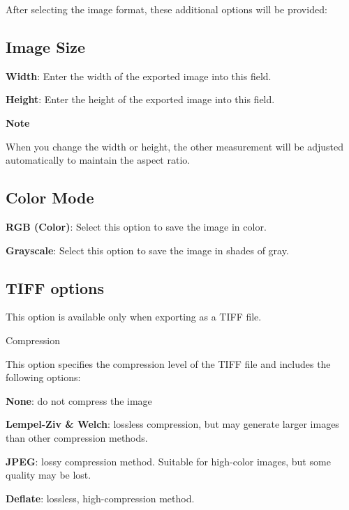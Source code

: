 \documentclass[
]{book}
\newenvironment{notesection}
    {
    \begin{tcolorbox}[colframe=mediumblue,colback=lightblue,coltext=mediumblue,arc=3mm]
    \faLightbulb[regular] \textbf{Note} \newline
    }
    {
    \end{tcolorbox}
    }
\newenvironment{optionssection}
    {
    \begin{tcolorbox}[colframe=lightgray,colback=ultralightgray,sharp corners=all,parbox=false]
    }
    {
    \end{tcolorbox}
    }
\newenvironment{optionssectiontitle}
    {
    \begin{tcolorbox}[colframe=lightgray,colback=lightgray]
    \bfseries
    }
    {
    \end{tcolorbox}
    }
\theoremstyle{definition}
\theoremstyle{definition}
\theoremstyle{definition}
\theoremstyle{definition}
\theoremstyle{remark}
\begin{document}
After selecting the image format, these additional options will be provided:

\hypertarget{image-size}{%
\subsection*{Image Size}\label{image-size}}

\textbf{Width}: Enter the width of the exported image into this field.

\textbf{Height}: Enter the height of the exported image into this field.

\begin{notesection}
When you change the width or height, the other measurement will be adjusted automatically to maintain the aspect ratio.

\end{notesection}

\hypertarget{color-mode}{%
\subsection*{Color Mode}\label{color-mode}}

\begin{optionssection}
\textbf{RGB (Color)}: Select this option to save the image in color.

\textbf{Grayscale}: Select this option to save the image in shades of gray.

\end{optionssection}

\hypertarget{tiff-options}{%
\subsection*{TIFF options}\label{tiff-options}}

This option is available only when exporting as a TIFF file.

\begin{optionssection}

\begin{optionssectiontitle}
Compression

\end{optionssectiontitle}

This option specifies the compression level of the TIFF file and includes the following options:

\textbf{None}: do not compress the image

\textbf{Lempel-Ziv \& Welch}: lossless compression, but may generate larger images than other compression methods.

\textbf{JPEG}: lossy compression method. Suitable for high-color images, but some quality may be lost.

\textbf{Deflate}: lossless, high-compression method.

\end{optionssection}
\end{document}
